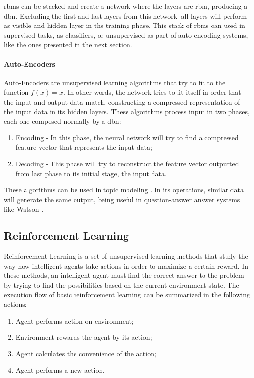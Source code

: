 \documentclass[
  twoside,
  11pt, a4paper,
  footinclude=true,
  headinclude=true,
  cleardoublepage=empty
]{scrbook}
\begin{document}
          \glspl{rbm} can be stacked and create a network where the layers are \gls{rbm}, producing a \gls{dbn}. Excluding the first and last layers from this network, all layers will perform as visible and hidden layer in the training phase. This stack of \glspl{rbm} can used in supervised tasks, as classifiers, or unsupervised as part of auto-encoding systems, like the ones presented in the next section.

        \paragraph{Auto-Encoders}
          Auto-Encoders are unsupervised learning algorithms that try to fit to the function $f(x) = x$. In other words, the network tries to fit itself in order that the input and output data match, constructing a compressed representation of the input data in its hidden layers. These algorithms process input in two phases, each one composed normally by a \gls{dbn}:

          \begin{enumerate}
            \item Encoding - In this phase, the neural network will try to find a compressed feature vector that represents the input data;
            \item Decoding - This phase will try to reconstruct the feature vector outputted from last phase to its initial stage, the input data.
          \end{enumerate}

          These algorithms can be used in topic modeling \cite{mirowski2010dynamic}. In its operations, similar data will generate the same output, being useful in question-answer answer systems like Watson \cite{high2012era}. %

      \subsection{Reinforcement Learning}
      Reinforcement Learning is a set of unsupervised learning methods that study the way how intelligent agents take actions in order to maximize a certain reward. In these methods, an intelligent agent must find the correct answer to the problem by trying to find the possibilities based on the current environment state. The execution flow of basic reinforcement learning can be summarized in the following actions:

      \begin{enumerate}
        \item Agent performs action on environment;
        \item Environment rewards the agent by its action;
        \item Agent calculates the convenience of the action;
        \item Agent performs a new action.
      \end{enumerate}
\end{document}
